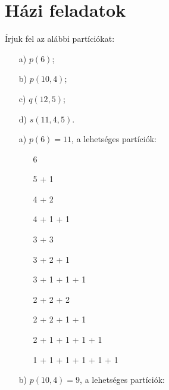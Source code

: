 \section*{Házi feladatok}
\begin{problem}
Írjuk fel az alábbi partíciókat: 
\begin{enumerate}
\item[a)] $p(6)$; 
\item[b)] $p(10,4)$; 
\item[c)] $q(12,5)$; 
\item[d)] $s(11,4,5)$. 
\end{enumerate}
\end{problem}
\begin{solution}
\hspace{0cm}
\begin{enumerate}
\item[a)] $p(6)=11$, a lehetséges partíciók:

\begin{minipage}[c]{0.3\textwidth}%
 \hspace{0cm} 
\begin{itemize}
\item[] 6 
\item[] 5 + 1 
\item[] 4 + 2 
\item[] 4 + 1 + 1 
\item[] 3 + 3 
\item[] 3 + 2 + 1 
\end{itemize}
\hspace{0cm} %
\end{minipage}%
\begin{minipage}[c]{0.45\textwidth}%
 \hspace{0cm} 
\begin{itemize}
\item[] 3 + 1 + 1 + 1 
\item[] 2 + 2 + 2 
\item[] 2 + 2 + 1 + 1 
\item[] 2 + 1 + 1 + 1 + 1 
\item[] 1 + 1 + 1 + 1 + 1 + 1 
\end{itemize}
\hspace{0cm} %
\end{minipage}
\item[b)] $p(10,4)=9$, a lehetséges partíciók:


\end{enumerate}
\end{solution}
